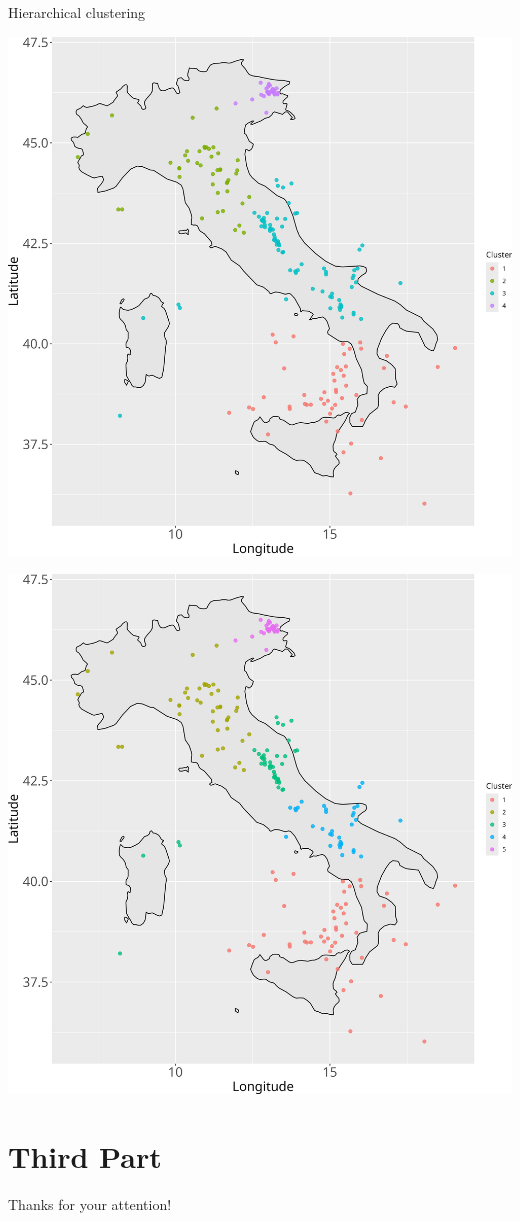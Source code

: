 \documentclass[aspectratio=43]{beamer}
\begin{document}
\begin{frame}{Hierarchical clustering}
	\vspace{0.25cm}
	
	\begin{minipage}{0.35\textwidth}
		\includegraphics[width=\textwidth]{EQ_images/clustering_4.png}
	\end{minipage}
	\hspace{0.05\textwidth}
	\begin{minipage}{0.35\textwidth}
		\includegraphics[width=\textwidth]{EQ_images/clustering_5.png}
	\end{minipage}
\end{frame}



\section{Third Part}




\begin{emptyframe}
	Thanks for your attention!
\end{emptyframe}
\end{document}
